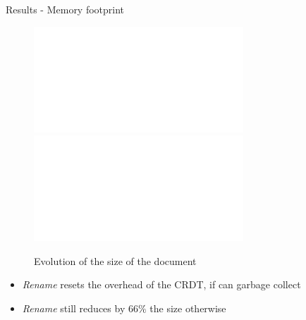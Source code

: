 \begin{frame}{Results - Memory footprint}
  \begin{figure}
    \centering
    \includegraphics<2>[width=0.7\textwidth]{img/snapshots-sizes-2.pdf}
    \includegraphics<3>[width=0.7\textwidth]{img/snapshots-sizes.pdf}
    \caption{Evolution of the size of the document}
    \label{fig:evolution-document-size}
  \end{figure}

  \vspace{-1\baselineskip}
  \begin{itemize}
    \item<2-> \emph{Rename} resets the overhead of the CRDT, if can garbage collect
    \item<3> \emph{Rename} still reduces by $66\%$ the size otherwise
  \end{itemize}
\end{frame}


